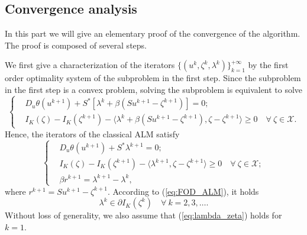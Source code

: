 \documentclass[leqno]{amsart}
\theoremstyle{definition}
\begin{document}
\subsection{Convergence analysis}In this part we will give an elementary proof of the convergence of the algorithm. The proof is composed of several steps. 

We first give a characterization of the iterators $\{(u^{k}, \zeta^k, \lambda^k)\}_{k=1}^{+\infty}$ by the first order optimality system of the subproblem in the first step. 
Since the subproblem in the first step is a convex problem, solving the subproblem is equivalent to solve
\begin{equation}\nonumber
\left\{
\begin{aligned}
& D_u\theta(u^{k+1}) + S^*[\lambda^k + \beta(Su^{k+1} - \zeta^{k+1})] = 0;\\
& I_K(\zeta) - I_K(\zeta^{k+1}) - \langle\lambda^k + \beta(Su^{k+1} - \zeta^{k+1}) ,\zeta - \zeta^{k+1}\rangle\geq 0\quad \forall\ \zeta\in \mathcal{X}.
\end{aligned}
\right.
\end{equation}
Hence, the iterators of the classical ALM satisfy
\begin{equation}\label{eq:FOD_ALM}
\left\{
\begin{aligned}
& D_u\theta(u^{k+1}) + S^*\lambda^{k+1} = 0;\\
& I_K(\zeta) - I_K(\zeta^{k+1}) - \langle\lambda^{k+1} ,\zeta - \zeta^{k+1}\rangle\geq 0\quad \forall\ \zeta\in \mathcal{X};\\
& \beta r^{k+1} = \lambda^{k+1} - \lambda^k,
\end{aligned}
\right.
\end{equation}
where $r^{k+1} = Su^{k+1} - \zeta^{k+1}$. According to (\ref{eq:FOD_ALM}), it holds
\begin{equation}\label{eq:lambda_zeta}
\lambda^k\in \partial I_K(\zeta^k)\quad \forall\ k=2, 3, \dots.
\end{equation}
Without loss of generality, we also assume that (\ref{eq:lambda_zeta}) holds for $k=1$.

\end{document}
